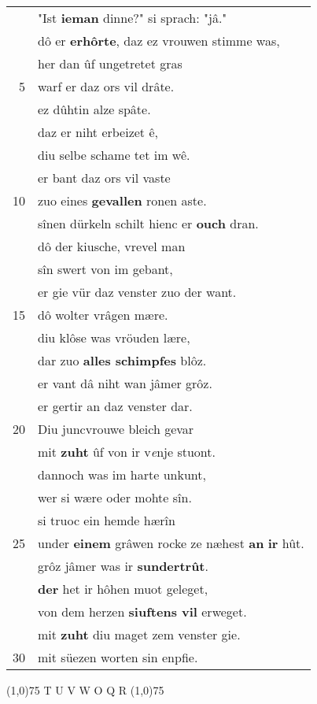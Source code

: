 \documentclass[8pt,a4paper,notitlepage]{article}
\begin{document}
\begin{table}[ht]
\begin{minipage}[t]{0.5\linewidth}
\begin{tabular}{rl}
 & "Ist \textbf{ieman} dinne?" si sprach: "jâ."\\ 
 & dô er \textbf{erhôrte}, daz ez vrouwen stimme was,\\ 
 & her dan ûf ungetretet gras\\ 
5 & warf er daz ors vil drâte.\\ 
 & ez dûhtin alze spâte.\\ 
 & daz er niht erbeizet ê,\\ 
 & diu selbe schame tet im wê.\\ 
 & er bant daz ors vil vaste\\ 
10 & zuo eines \textbf{gevallen} ronen aste.\\ 
 & sînen dürkeln schilt hienc er \textbf{ouch} dran.\\ 
 & dô der kiusche, vrevel man\\ 
 & sîn swert von im gebant,\\ 
 & er gie vür daz venster zuo der want.\\ 
15 & dô wolter vrâgen mære.\\ 
 & diu klôse was vröuden lære,\\ 
 & dar zuo \textbf{alles schimpfes} blôz.\\ 
 & er vant dâ niht wan jâmer grôz.\\ 
 & er gertir an daz venster dar.\\ 
20 & Diu juncvrouwe bleich gevar\\ 
 & mit \textbf{zuht} ûf von ir v\textit{e}nje stuont.\\ 
 & dannoch was im harte unkunt,\\ 
 & wer si wære oder mohte sîn.\\ 
 & si truoc ein hemde hærîn\\ 
25 & under \textbf{einem} grâwen rocke ze næhest \textbf{an} \textbf{ir} hût.\\ 
 & grôz jâmer was ir \textbf{sundertrût}.\\ 
 & \textbf{der} het ir hôhen muot geleget,\\ 
 & von dem herzen \textbf{siuftens vil} erweget.\\ 
 & mit \textbf{zuht} diu maget zem venster gie.\\ 
30 & mit süezen worten sin enpfie.\\ 
\end{tabular}
\scriptsize
\line(1,0){75} \newline
T U V W O Q R \newline
\line(1,0){75} \newline

\end{minipage}
\end{table}
\end{document}
